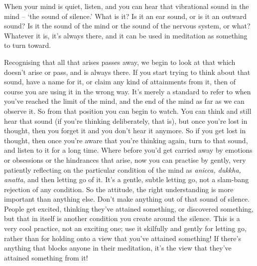 
When your mind is quiet, listen, and you can hear that vibrational sound in the mind -- `the sound of silence.' What is it? Is it an ear sound, or is it an outward sound? Is it the sound of the mind or the sound of the nervous system, or what? Whatever it is, it's always there, and it can be used in meditation as something to turn toward.

Recognising that all that arises passes away, we begin to look at that which doesn't arise or pass, and is always there. If you start trying to think about that sound, have a name for it, or claim any kind of attainments from it, then of course you are using it in the wrong way. It's merely a standard to refer to when you've reached the limit of the mind, and the end of the mind as far as we can observe it. So from that position you can begin to watch. You can think and still hear that sound (if you're thinking deliberately, that is), but once you're lost in thought, then you forget it and you don't hear it anymore. So if you get lost in thought, then once you're aware that you're thinking again, turn to that sound, and listen to it for a long time. Where before you'd get carried away by emotions or obsessions or the hindrances that arise, now you can practise by gently, very patiently reflecting on the particular condition of the mind as \textit{anicca, dukkha, anatta}, and then letting go of it. It's a gentle, subtle letting go, not a slam-bang rejection of any condition. So the attitude, the right understanding is more important than anything else. Don't make anything out of that sound of silence. People get excited, thinking they've attained something, or discovered something, but that in itself is another condition you create around the silence. This is a very cool practice, not an exciting one; use it skilfully and gently for letting go, rather than for holding onto a view that you've attained something! If there's anything that blocks anyone in their meditation, it's the view that they've attained something from it!


